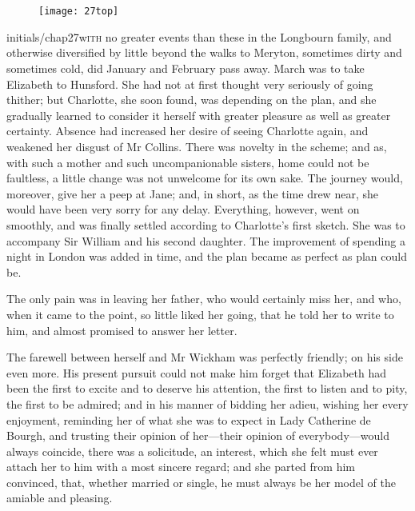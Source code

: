 \chapter[Chapter \thechapter]{}

\begin{figure}[t!]
\centering
\texttt{[image: 27top]}
\end{figure}


\lettrine[lines=6,image=true]{initials/chap27w}{ith}  no greater events than these in the Longbourn family, and otherwise diversified by little beyond the walks to Meryton, sometimes dirty and sometimes cold, did January and February pass away. March was to take Elizabeth to Hunsford. She had not at first thought very seriously of going thither; but Charlotte, she soon found, was depending on the plan, and she gradually learned to consider it herself with greater pleasure as well as greater certainty. Absence had increased her desire of seeing Charlotte again, and weak\-ened her disgust of Mr Collins. There was novelty in the scheme; and as, with such a mother and such uncompanionable sisters, home could not be faultless, a little change was not unwelcome for its own sake. The journey would, moreover, give her a peep at Jane; and, in short, as the time drew near, she would have been very sorry for any delay. Everything, however, went on smoothly, and was finally settled according to Charlotte's first sketch. She was to accompany Sir William and his second daughter. The improvement of spending a night in London was added in time, and the plan became as perfect as plan could be.

The only pain was in leaving her father, who would certainly miss her, and who, when it came to the point, so little liked her going, that he told her to write to him, and almost promised to answer her letter.

The farewell between herself and Mr Wickham was perfectly friendly; on his side even more. His present pursuit could not make him forget that Elizabeth had been the first to excite and to deserve his attention, the first to listen and to pity, the first to be admired; and in his manner of bidding her adieu, wishing her every enjoyment, reminding her of what she was to expect in Lady Catherine de Bourgh, and trusting their opinion of her—their opinion of everybody—would always coincide, there was a solicitude, an interest, which she felt must ever attach her to him with a most sincere regard; and she parted from him convinced, that, whether married or single, he must always be her model of the amiable and pleasing.

